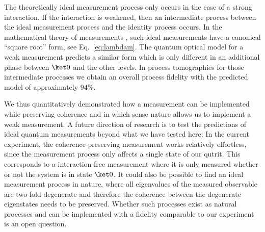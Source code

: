 \documentclass[
aps,prl,
reprint,
a4paper,
superscriptaddress,
floatfix,
]{revtex4-1}
\begin{document}
The theoretically ideal measurement process only occurs in the case of a strong 
 interaction.
If the interaction is weakened, then an intermediate process between the ideal 
 measurement process and the identity process occurs.
In the mathematical theory of measurements \cite{Heinosaari12}, such ideal 
 measurements have a canonical ``square root'' form, see 
 Eq.~\eqref{eq:lambdam}.
The quantum optical model for a weak measurement predicts a 
 similar form which is only different in an additional phase between $\ket0$ 
 and the other levels.
In process tomographies for those intermediate processes we obtain an overall process 
 fidelity with the predicted model of approximately $94\%$.

We thus quantitatively demonstrated how a measurement can be implemented while 
 preserving coherence and in which sense nature allows us to implement a weak 
 measurement.
A future direction of research is to test the predictions of ideal quantum 
 measurements beyond what we have tested here:
In the current experiment, the coherence-preserving measurement works 
 relatively effortless, since the measurement process only affects a 
 single state of our qutrit.
This corresponds to a interaction-free measurement where it is only measured whether or 
 not the system is in state $\ket 0$.
It could also be possible to find an ideal measurement process in nature, where 
 all eigenvalues of the measured observable are two-fold degenerate and 
 therefore the coherence between the degenerate eigenstates needs to be 
 preserved.
Whether such processes exist as natural processes and can be implemented with a 
 fidelity comparable to our experiment is an open question.
\end{document}

